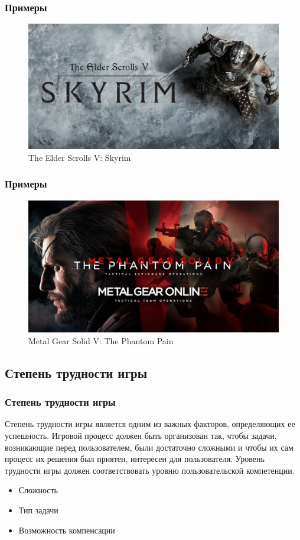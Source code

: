 \documentclass[10pt]{beamer}
\begin{document}
\begin{frame}
  \frametitle{Примеры}
  \centering
  \begin{figure}
    \includegraphics[width=\textwidth]{res/img/skyrim.jpg}
    \caption{The Elder Scrolls V: Skyrim}
  \end{figure}
\end{frame}

\begin{frame}
  \frametitle{Примеры}
  \centering
  \begin{figure}
    \includegraphics[width=\textwidth]{res/img/mgs.jpg}
    \caption{Metal Gear Solid V: The Phantom Pain}
  \end{figure}
\end{frame}

\subsection{Степень трудности игры}
\begin{frame}
\frametitle{Степень трудности игры}

\begin{block}{}
  Степень трудности игры является одним из важных факторов, определяющих ее успешность. Игровой процесс должен быть организован так, чтобы задачи, возникающие перед пользователем, были достаточно сложными и чтобы их сам процесс их решения был приятен, интересен для пользователя. Уровень трудности игры должен соответствовать уровню пользовательской компетенции.
  \begin{itemize}
    \item Сложность
    \item Тип задачи
    \item Возможность компенсации
  \end{itemize}
\end{block}

\end{frame}
\end{document}
